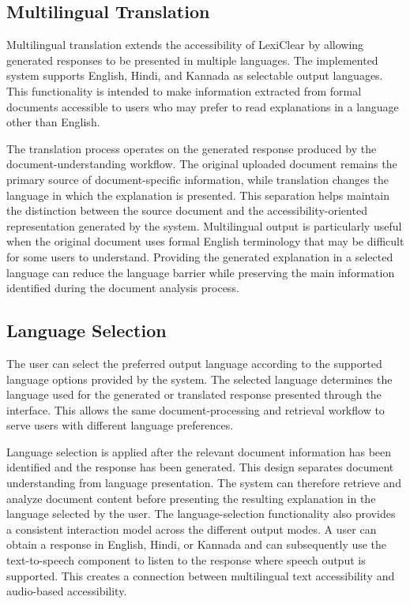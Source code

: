 \documentclass[12pt,a4paper,oneside]{report}
\begin{document}
\subsection{Multilingual Translation}

Multilingual translation extends the accessibility of LexiClear by allowing generated responses to be presented in multiple languages. The implemented system supports English, Hindi, and Kannada as selectable output languages. This functionality is intended to make information extracted from formal documents accessible to users who may prefer to read explanations in a language other than English.

The translation process operates on the generated response produced by the document-understanding workflow. The original uploaded document remains the primary source of document-specific information, while translation changes the language in which the explanation is presented. This separation helps maintain the distinction between the source document and the accessibility-oriented representation generated by the system. Multilingual output is particularly useful when the original document uses formal English terminology that may be difficult for some users to understand. Providing the generated explanation in a selected language can reduce the language barrier while preserving the main information identified during the document analysis process.

\subsection{Language Selection}

The user can select the preferred output language according to the supported language options provided by the system. The selected language determines the language used for the generated or translated response presented through the interface. This allows the same document-processing and retrieval workflow to serve users with different language preferences.

Language selection is applied after the relevant document information has been identified and the response has been generated. This design separates document understanding from language presentation. The system can therefore retrieve and analyze document content before presenting the resulting explanation in the language selected by the user. The language-selection functionality also provides a consistent interaction model across the different output modes. A user can obtain a response in English, Hindi, or Kannada and can subsequently use the text-to-speech component to listen to the response where speech output is supported. This creates a connection between multilingual text accessibility and audio-based accessibility.
\end{document}

